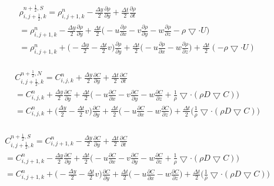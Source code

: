 \documentclass{article}
\numberwithin{equation}{subsection}
\begin{document}
\begin{align}
\begin{split}
& \rho_{i,j+\frac{1}{2},k}^{n+\frac{1}{2},S} = \rho_{i,j+1,k}^n - \frac{\Delta y}{2} \frac{\partial \rho}{\partial y} + \frac{\Delta t}{2} \frac{\partial \rho}{\partial t} \\
& = \rho_{i,j+1,k}^{n} - \frac{\Delta y}{2} \frac{\partial \rho}{\partial y} + \frac{\Delta t}{2} \Big( -u\frac{\partial \rho}{\partial x} - v\frac{\partial \rho}{\partial y} - w\frac{\partial \rho}{\partial z} - \rho \bigtriangledown \cdot U \Big) \\
& = \rho_{i,j+1,k}^{n} + \big( -\frac{\Delta y}{2} - \frac{\Delta t}{2}v\big)\frac{\partial \rho}{\partial y} + \frac{\Delta t}{2} \big( - u\frac{\partial \rho}{\partial x} - w\frac{\partial \rho}{\partial z} \big) + \frac{\Delta t}{2} (-\rho \bigtriangledown \cdot U)
\end{split}
\end{align}

\begin{align}
\begin{split}
& C_{i,j+\frac{1}{2},k}^{n+\frac{1}{2},N} = C_{i,j,k}^n + \frac{\Delta y}{2} \frac{\partial C}{\partial y} + \frac{\Delta t}{2} \frac{\partial C}{\partial t} \\
&= C_{i,j,k}^{n} + \frac{\Delta y}{2} \frac{\partial C}{\partial y} + \frac{\Delta t}{2} \Big( -u\frac{\partial C}{\partial x} - v\frac{\partial C}{\partial y} - w\frac{\partial C}{\partial z} + \frac{1}{\rho} \bigtriangledown \cdot( \rho D \bigtriangledown C) \Big) \\
&= C_{i,j,k}^{n} + \Big( \frac{\Delta y}{2} - \frac{\Delta t}{2}v\Big)\frac{\partial C}{\partial y} + \frac{\Delta t}{2} \Big( -u\frac{\partial C}{\partial x} -w\frac{\partial C}{\partial z} \big) + \frac{\Delta t}{2} \Big( \frac{1}{\rho} \bigtriangledown \cdot( \rho D \bigtriangledown C)\Big)
\end{split}
\end{align}

\begin{align}
\begin{split}
& C_{i,j+\frac{1}{2},k}^{n+\frac{1}{2},S} = C_{i,j+1,k}^n - \frac{\Delta y}{2} \frac{\partial C}{\partial y} + \frac{\Delta t}{2} \frac{\partial C}{\partial t} \\
&= C_{i,j+1,k}^{n} - \frac{\Delta y}{2} \frac{\partial C}{\partial y} + \frac{\Delta t}{2} \Big( -u\frac{\partial C}{\partial x} - v\frac{\partial C}{\partial y} - w\frac{\partial C}{\partial z} + \frac{1}{\rho} \bigtriangledown \cdot( \rho D \bigtriangledown C) \Big) \\
&= C_{i,j+1,k}^{n} + \Big( -\frac{\Delta y}{2} - \frac{\Delta t}{2}v\Big)\frac{\partial C}{\partial y} + \frac{\Delta t}{2} \Big( -u\frac{\partial C}{\partial x} -w\frac{\partial C}{\partial z} \big) + \frac{\Delta t}{2} \Big( \frac{1}{\rho} \bigtriangledown \cdot( \rho D \bigtriangledown C)\Big)
\end{split}
\end{align}
\end{document}
